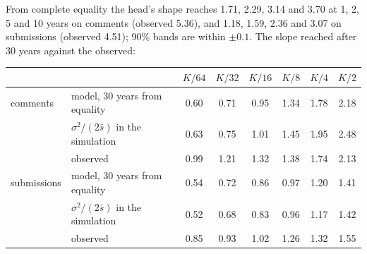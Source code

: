 \documentclass[10pt]{article}
\begin{document}
\begin{center}\small{}\end{center}
From complete equality the head's shape reaches 1.71, 2.29, 3.14 and 3.70 at 1, 2, 5 and 10 years on comments (observed 5.36), and 1.18, 1.59, 2.36 and 3.07 on submissions (observed 4.51); 90\% bands are within $\pm0.1$. The slope reached after 30 years against the observed:
\begin{center}\small\begin{tabular}{llcccccc}
\toprule
 & & $K/64$ & $K/32$ & $K/16$ & $K/8$ & $K/4$ & $K/2$\\
\midrule
comments & model, 30 years from equality & 0.60 & 0.71 & 0.95 & 1.34 & 1.78 & 2.18\\
 & \quad $\sigma^2/(2\bar s)$ in the simulation & 0.63 & 0.75 & 1.01 & 1.45 & 1.95 & 2.48\\
 & \quad observed & 0.99 & 1.21 & 1.32 & 1.38 & 1.74 & 2.13\\
submissions & model, 30 years from equality & 0.54 & 0.72 & 0.86 & 0.97 & 1.20 & 1.41\\
 & \quad $\sigma^2/(2\bar s)$ in the simulation & 0.52 & 0.68 & 0.83 & 0.96 & 1.17 & 1.42\\
 & \quad observed & 0.85 & 0.93 & 1.02 & 1.26 & 1.32 & 1.55\\
\bottomrule
\end{tabular}\end{center}
\end{document}
